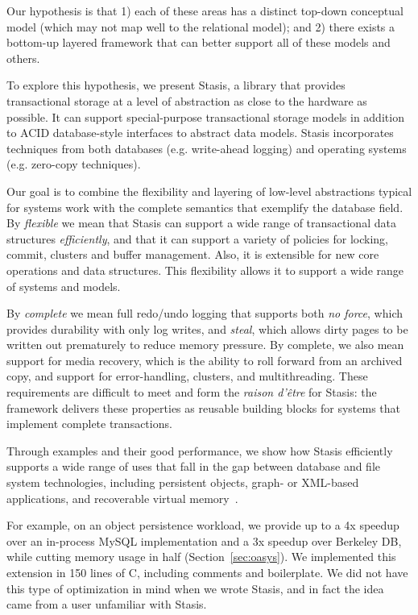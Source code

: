 \documentclass[letterpaper,twocolumn,10pt]{article}
\newcommand{\yad}{Stasis\xspace}
\begin{document}
Our hypothesis is that 1) each of these areas has a distinct top-down
conceptual model (which may not map well to the relational model); and
2) there exists a bottom-up layered framework that can better support
all of these models and others.

To explore this hypothesis, we present \yad, a library that provides
transactional storage at a level of abstraction as close to the
hardware as possible.  It can support special-purpose
transactional storage models in addition to ACID database-style
interfaces to abstract data models.  \yad incorporates techniques from both
databases (e.g. write-ahead logging) and operating systems
(e.g. zero-copy techniques).

Our goal is to combine the flexibility and layering of low-level
abstractions typical for systems work with the complete semantics
that exemplify the database field.
By {\em flexible} we mean that \yad{}  can support a wide
range of transactional data structures {\em efficiently}, and that it can support a variety
of policies for locking, commit, clusters and buffer management.
Also, it is extensible for new core operations
and data structures. This flexibility allows it to
support a wide range of systems and models.

By {\em complete} we mean full redo/undo logging that supports
both {\em no force}, which provides durability with only log writes,
and {\em steal}, which allows dirty pages to be written out prematurely
to reduce memory pressure. By complete, we also
mean support for media recovery, which is the ability to roll
forward from an archived copy, and support for error-handling,
clusters, and multithreading. These requirements are difficult
to meet and form the {\em raison d'\^etre} for \yad{}: the framework
delivers these properties as reusable building blocks for systems
that implement complete transactions.

Through examples and their good performance, we show how \yad{}
efficiently supports a wide range of uses that fall in the gap between 
database and file system technologies, including
persistent objects, graph- or XML-based applications, and recoverable
virtual memory~\cite{lrvm}.  

For example, on an object persistence workload, we provide up to 
a 4x speedup over an in-process MySQL implementation and a 3x speedup over Berkeley DB, while 
cutting memory usage in half (Section~\ref{sec:oasys}). 
We implemented this extension in 150 lines of C, including comments and boilerplate.  We did not have this type of optimization
in mind when we wrote \yad, and in fact the idea came from a
user unfamiliar with \yad.
\end{document}
